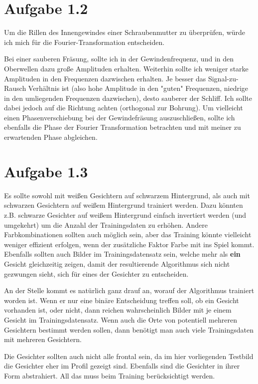 \documentclass{article}
\begin{document}
\section*{Aufgabe 1.2}

Um die Rillen des Innengewindes einer Schraubenmutter zu überprüfen, würde ich mich für die Fourier-Transformation entscheiden.

Bei einer sauberen Fräsung, sollte ich in der Gewindenfrequenz, und in den Oberwellen dazu große Amplituden erhalten. Weiterhin sollte ich weniger starke Amplituden in den Frequenzen dazwischen erhalten. Je besser das Signal-zu-Rausch 
Verhältnis ist (also hohe Amplitude in den "guten" Frequenzen, niedrige in den umliegenden Frequenzen dazwischen), desto sauberer der Schliff. Ich sollte dabei jedoch auf die Richtung achten (orthogonal zur Bohrung). Um vielleicht einen Phasenverschiebung bei der Gewindefräsung auszuschließen, sollte ich ebenfalls die Phase der Fourier Transformation betrachten und mit meiner zu erwartenden Phase abgleichen.

\section*{Aufgabe 1.3}

Es sollte sowohl mit weißen Gesichtern auf schwarzem Hintergrund, als auch mit schwarzen Gesichtern auf weißem Hintergrund trainiert werden. Dazu könnten z.B. schwarze Gesichter auf weißem Hintergrund einfach invertiert werden (und umgekehrt) um die Anzahl der Trainingsdaten zu erhöhen. Andere Farbkombinationen sollten auch möglich sein, aber das Training könnte vielleicht weniger effizient erfolgen, wenn der zusätzliche Faktor Farbe mit ins Spiel kommt. Ebenfalls sollten auch Bilder im Trainingsdatensatz sein, welche mehr als \textbf{ein} Gesicht gleichzeitig zeigen, damit der resultierende Algorithmus sich nicht gezwungen sieht, sich für eines der Gesichter zu entscheiden.

An der Stelle kommt es natürlich ganz drauf an, worauf der Algorithmus trainiert worden ist. Wenn er nur eine binäre Entscheidung treffen soll, ob ein Gesicht vorhanden ist, oder nicht, dann reichen wahrscheinlich Bilder mit je einem Gesicht im Trainingsdatensatz. Wenn auch die Orte von potentiell mehreren Gesichtern bestimmt werden sollen, dann benötigt man auch viele Trainingsdaten mit mehreren Gesichtern.

Die Gesichter sollten auch nicht alle frontal sein, da im hier vorliegenden Testbild die Gesichter eher im Profil gezeigt sind. Ebenfalls sind die Gesichter in ihrer Form abstrahiert. All das muss beim Training berücksichtigt werden.
\end{document}
